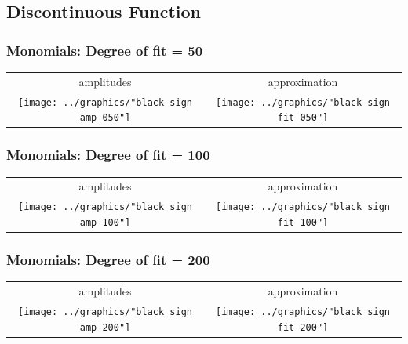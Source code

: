 \documentclass[handout]{beamer}
\begin{document}
{{{{%
\subsection{Discontinuous Function}

\begin{frame}      %
  \frametitle{Monomials: Degree of fit = 50}
  \begin{table}[htdp]
     \begin{center}
        \begin{tabular}{cc}
          amplitudes & approximation \\[10pt]
          \texttt{[image: ../graphics/"black sign amp 050"]} &
          \texttt{[image: ../graphics/"black sign fit 050"]}
        \end{tabular}
     \end{center}
  \end{table}%
\end{frame}

\begin{frame}      %
  \frametitle{Monomials: Degree of fit = 100}
  \begin{table}[htdp]
     \begin{center}
        \begin{tabular}{cc}
          amplitudes & approximation \\[10pt]
          \texttt{[image: ../graphics/"black sign amp 100"]} &
          \texttt{[image: ../graphics/"black sign fit 100"]}
        \end{tabular}
     \end{center}
  \end{table}%
\end{frame}

\begin{frame}      %
  \frametitle{Monomials: Degree of fit = 200}
  \begin{table}[htdp]
     \begin{center}
        \begin{tabular}{cc}
          amplitudes & approximation \\[10pt]
          \texttt{[image: ../graphics/"black sign amp 200"]} &
          \texttt{[image: ../graphics/"black sign fit 200"]}
        \end{tabular}
     \end{center}
  \end{table}%
  \donedot
\end{frame}

}}}}
\end{document}
